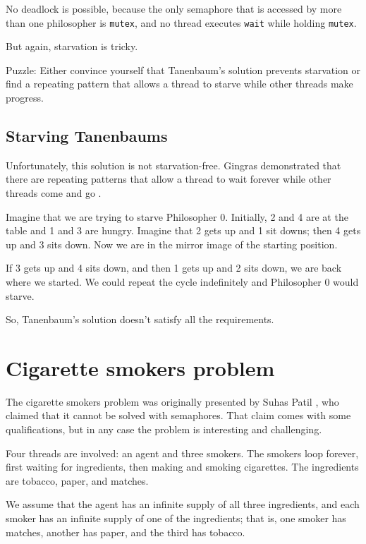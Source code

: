 \documentclass{book}
\newcommand{\clearemptydoublepage}{\newpage\cleardoublepage}
\begin{document}
No deadlock is possible, because the only semaphore that is accessed
by more than one philosopher is {\tt mutex}, and no thread executes
{\tt wait} while holding {\tt mutex}.

But again, starvation is tricky.

Puzzle: Either convince yourself that Tanenbaum's solution prevents
starvation or find a repeating pattern that allows a thread to starve
while other threads make progress.


\clearemptydoublepage
\subsection{Starving Tanenbaums}

Unfortunately, this solution is not starvation-free.  Gingras
demonstrated that there are repeating patterns that allow a
thread to wait forever while other threads come and go
\cite{gingras90dining}.

Imagine that we are trying to starve Philosopher 0.  Initially,
2 and 4 are at the table and 1 and 3 are hungry.  Imagine that 2 gets up and
1 sit downs; then 4 gets up and 3 sits down.
Now we are in the mirror image of the starting position.

If 3 gets up and 4 sits
down, and then 1 gets up and 2 sits down, we are back
where we started.  We could repeat the cycle indefinitely and
Philosopher 0 would starve.

So, Tanenbaum's solution doesn't satisfy all the requirements.




\clearemptydoublepage
\section {Cigarette smokers problem}

The cigarette smokers problem was originally presented by
Suhas Patil \cite{patil}, who claimed that it cannot be solved with
semaphores.  That claim comes with some qualifications, but in
any case the problem is interesting and challenging.

Four threads are involved: an agent and three smokers.  The smokers
loop forever, first waiting for ingredients, then making and smoking
cigarettes.  The ingredients are tobacco, paper, and matches.

We assume that the agent has an infinite supply of all three
ingredients, and each smoker has an infinite supply of one of
the ingredients; that is, one smoker has matches, another has
paper, and the third has tobacco.
\end{document}
